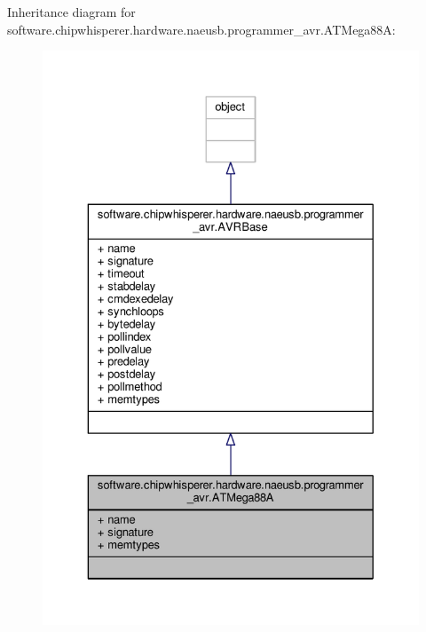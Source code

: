 Inheritance diagram for software.\+chipwhisperer.\+hardware.\+naeusb.\+programmer\+\_\+avr.\+A\+T\+Mega88\+A\+:\nopagebreak
\begin{figure}[H]
\begin{center}
\leavevmode
\includegraphics[width=329pt]{d8/dbc/classsoftware_1_1chipwhisperer_1_1hardware_1_1naeusb_1_1programmer__avr_1_1ATMega88A__inherit__graph}
\end{center}
\end{figure}


